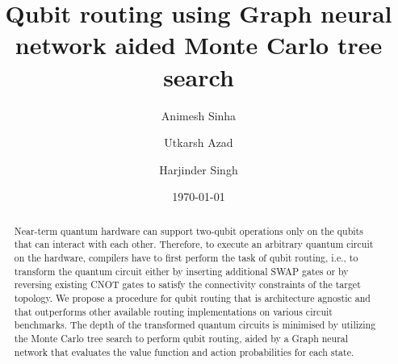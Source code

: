 \documentclass[%
 reprint,
amsmath,amssymb,
pra,
]{revtex4-2}
\begin{document}

\title{Qubit routing using Graph neural network aided Monte Carlo tree search}

\author{Animesh Sinha}
\author{Utkarsh Azad}
\author{Harjinder Singh}

%

\date{\today}%

\begin{abstract}
Near-term quantum hardware can support two-qubit operations only on the qubits that can interact with each other. Therefore, to execute an arbitrary quantum circuit on the hardware, compilers have to first perform the task of qubit routing, i.e., to transform the quantum circuit either by inserting additional SWAP gates or by reversing existing CNOT gates to satisfy the connectivity constraints of the target topology. We propose a procedure for qubit routing that is architecture agnostic and that outperforms other available routing implementations on various circuit benchmarks. The depth of the transformed quantum circuits is minimised by utilizing the Monte Carlo tree search to perform qubit routing, aided by a Graph neural network that evaluates the value function and action probabilities for each state.

\end{abstract}
\end{document}
